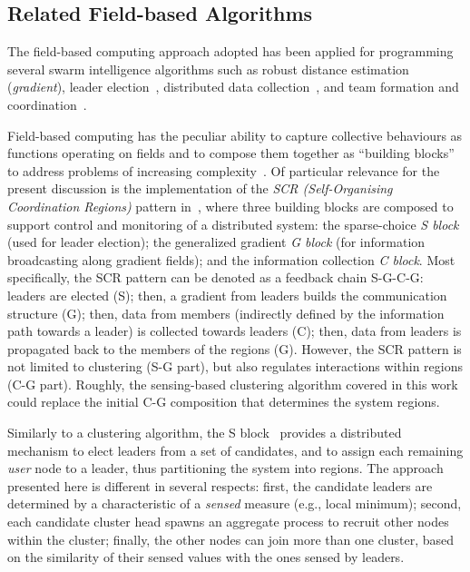 \subsection{Related Field-based Algorithms} %
\label{s:rw:related-ac-algorithms}
The field-based computing approach adopted has been applied for
 programming several swarm intelligence algorithms
 such as robust distance estimation (\emph{gradient}),%
 leader election~\cite{DBLP:conf/saso/MoBD18},
 distributed data collection~\cite{audrito2021jcee-distributed-collection},
 and team formation and coordination~\cite{DBLP:journals/eaai/CasadeiVAPD21}.

Field-based computing has the peculiar ability to capture collective behaviours as functions operating on fields
and to compose them together as ``building blocks'' to address problems of increasing complexity~\cite{DBLP:journals/jlap/ViroliBDACP19}.
%
Of particular relevance for the present discussion is the implementation of the \emph{SCR (Self-Organising Coordination Regions)} pattern in~\cite{DBLP:journals/fgcs/PianiniCVN21}, where three building blocks are composed to support control and monitoring of a distributed system: the sparse-choice \emph{S block} (used for leader election); the generalized gradient \emph{G block} (for information broadcasting along gradient fields); and the information collection \emph{C block}.
%
Most specifically, the SCR pattern can be denoted as a feedback chain S-G-C-G: leaders are elected (S); then, a gradient from leaders builds the communication structure (G); then, data from members (indirectly defined by the information path towards a leader) is collected towards leaders (C); then, data from leaders is propagated back to the members of the regions (G).
%
However, the SCR pattern is not limited to clustering (S-G part), but also regulates interactions within regions (C-G part).
%
Roughly, the sensing-based clustering algorithm
 covered in this work could replace the initial C-G composition
 that determines the system regions.

Similarly to a clustering algorithm, 
 the S block~\cite{DBLP:conf/saso/MoBD18} provides a distributed mechanism to elect leaders from a set of candidates, 
 and to assign each remaining {\em user} node to a leader, 
 thus partitioning the system into regions. 
% 
The approach presented here is different in several respects: 
%
 first, the candidate leaders are determined by a characteristic of a \emph{sensed} measure (e.g., local minimum); 
%
 second, each candidate cluster head spawns an aggregate process to recruit other nodes within the cluster; 
% 
 finally, the other nodes can join more than one cluster, based on the similarity of their sensed values with the ones sensed by leaders.

